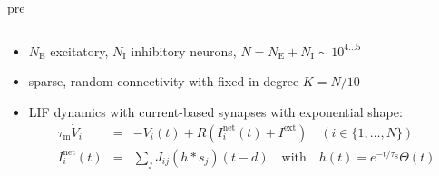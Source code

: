 \documentclass[8pt,t,usepdftitle=false]{beamer}
\newcommand{\Ex}{\text{E}}
\newcommand{\In}{\text{I}}
\newcommand{\tauM}{\tau_{\text{m}}}
\newcommand{\tauS}{\tau_{\text{S}}{}}
\begin{document}
\begin{frame}[t,plain]
\begin{columns}
    \hspace{3ex}pre
  \end{columns}
  \begin{itemize}
  \item<1> $N_\Ex$ excitatory, $N_\In$ inhibitory neurons,
    $N=N_\Ex+N_\In\sim{}10^{4\ldots{}5}$
  \item<1> sparse, random connectivity with fixed in-degree $K=N/10$ 
  \item<1> LIF dynamics with current-based synapses with exponential shape:
    \begin{eqnarray*}
      \tauM{}\dot{V}_i &=& -V_i(t)+R\left(I_{i}^\text{net}(t)+I^\text{ext}\right)
                           \quad(i\in\{1,\ldots,N\})\\
      I_{i}^\text{net}(t) &=& \sum_{j} J_{ij} (h*s_j)(t-d)
                              \quad\text{with}\quad{}h(t)=e^{-t/\tauS}\Theta(t)
    \end{eqnarray*}
  \end{itemize}
\end{frame}
\end{document}
